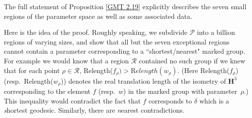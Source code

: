 The full statement of Proposition \ref{GMT 2.19}
explicitly describes the seven small
regions of the parameter space as well as some associated data.

Here is the idea of the proof.
Roughly speaking, we subdivide ${\mathcal P}$ into a billion regions
of varying sizes,
and show that all but the seven exceptional regions cannot contain 
a parameter corresponding to a  
``shortest/nearest" marked group.
For example we would know that 
a region ${\mathcal R}$ contained no such group if we knew that for each 
point $\rho\in {\mathcal R}$,
Relength($f_\rho) > {\mathrm Relength}(w_\rho).$  
(Here Relength($f_\rho$) (resp.\ Relength($w_\rho^{\phantom{|}}$))
denotes the real translation length of the isometry of ${\mathbf H}^3$ 
corresponding to
the element $f$ (resp.\ $w$) in the marked group with parameter~$\rho.$)
This inequality would contradict the fact that $f$ corresponds to $\delta$ 
which is a {\textit shortest} geodesic.  Similarly, there are {\textit nearest}
contradictions.
